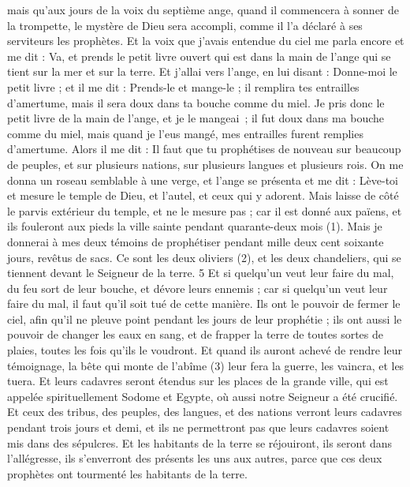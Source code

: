\begin{multicols}{2}
mais qu'aux jours de la voix du septième ange, quand il commencera à sonner de la trompette, le mystère de Dieu sera accompli, comme il l'a déclaré à ses serviteurs les prophètes.
Et la voix que j'avais entendue du ciel me parla encore et me dit : Va, et prends le petit livre ouvert qui est dans la main de l'ange qui se tient sur la mer et sur la terre.
Et j’allai vers l'ange, en lui disant : Donne-moi le petit livre ; et il me dit : Prends-le et mange-le ; il remplira tes entrailles d'amertume, mais il sera doux dans ta bouche comme du miel.
Je pris donc le petit livre de la main de l'ange, et je le mangeai ; il fut doux dans ma bouche comme du miel, mais quand je l'eus mangé, mes entrailles furent remplies d'amertume.
Alors il me dit : Il faut que tu prophétises de nouveau sur beaucoup de peuples, et sur plusieurs nations, sur plusieurs langues et plusieurs rois.
\VerseOne{}On me donna un roseau semblable à une verge, et l’ange se présenta et me dit : Lève-toi et mesure le temple de Dieu, et l'autel, et ceux qui y adorent.
Mais laisse de côté le parvis extérieur du temple, et ne le mesure pas ; car il est donné aux païens, et ils fouleront aux pieds la ville sainte pendant quarante-deux mois (1).
Mais je donnerai à mes deux témoins de prophétiser pendant mille deux cent soixante jours, revêtus de sacs.
Ce sont les deux oliviers (2), et les deux chandeliers, qui se tiennent devant le Seigneur de la terre. 5 Et si quelqu'un veut leur faire du mal, du feu sort de leur bouche, et dévore leurs ennemis ; car si quelqu'un veut leur faire du mal, il faut qu'il soit tué de cette manière.
Ils ont le pouvoir de fermer le ciel, afin qu'il ne pleuve point pendant les jours de leur prophétie ; ils ont aussi le pouvoir de changer les eaux en sang, et de frapper la terre de toutes sortes de plaies, toutes les fois qu'ils le voudront.
Et quand ils auront achevé de rendre leur témoignage, la bête qui monte de l'abîme (3) leur fera la guerre, les vaincra, et les tuera.
Et leurs cadavres seront étendus sur les places de la grande ville, qui est appelée spirituellement Sodome et Egypte, où aussi notre Seigneur a été crucifié.
Et ceux des tribus, des peuples, des langues, et des nations verront leurs cadavres pendant trois jours et demi, et ils ne permettront pas que leurs cadavres soient mis dans des sépulcres.
Et les habitants de la terre se réjouiront, ils seront dans l’allégresse, ils s'enverront des présents les uns aux autres, parce que ces deux prophètes ont tourmenté les habitants de la terre.

\end{multicols}
